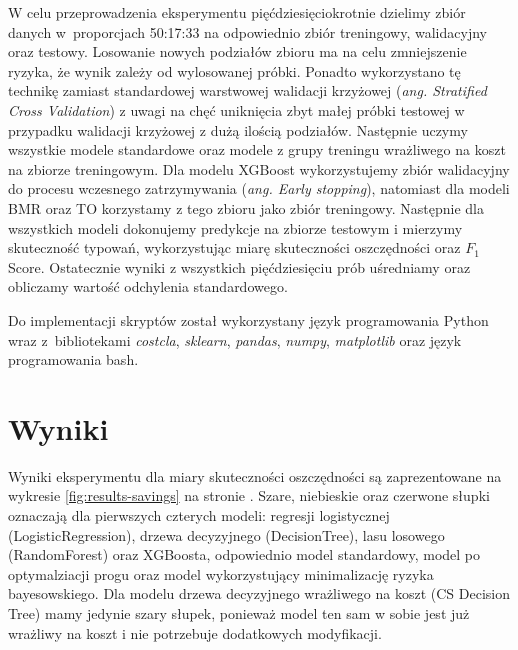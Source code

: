 \documentclass[inzynierska]{pwr_wmat_praca_dyplomowa}
\theoremstyle{plain}
\numberwithin{theorem}{chapter}
\theoremstyle{definition}
\numberwithin{theorem}{chapter}
\begin{document}
W celu przeprowadzenia eksperymentu pięćdziesięciokrotnie dzielimy zbiór danych w~proporcjach 50:17:33 na odpowiednio zbiór treningowy, walidacyjny oraz testowy. Losowanie nowych podziałów zbioru ma na celu zmniejszenie ryzyka, że wynik zależy od wylosowanej próbki. Ponadto wykorzystano tę technikę zamiast standardowej warstwowej walidacji krzyżowej (\textit{ang. Stratified Cross Validation}) z uwagi na chęć uniknięcia zbyt małej próbki testowej w przypadku walidacji krzyżowej z dużą ilością podziałów. Następnie uczymy wszystkie modele standardowe oraz modele z grupy treningu wrażliwego na koszt na zbiorze treningowym. Dla modelu XGBoost wykorzystujemy zbiór walidacyjny do procesu wczesnego zatrzymywania (\textit{ang. Early stopping}), natomiast dla modeli BMR oraz TO korzystamy z tego zbioru jako zbiór treningowy. Następnie dla wszystkich modeli dokonujemy predykcje na zbiorze testowym i mierzymy skuteczność typowań, wykorzystując miarę skuteczności oszczędności oraz $F_1$ Score. 
Ostatecznie wyniki z wszystkich pięćdziesięciu prób uśredniamy oraz obliczamy wartość odchylenia standardowego.

Do implementacji skryptów został wykorzystany język programowania Python wraz z~bibliotekami \textit{costcla}, \textit{sklearn}, \textit{pandas}, \textit{numpy}, \textit{matplotlib} oraz język programowania bash.

\section{Wyniki}

Wyniki eksperymentu dla miary skuteczności oszczędności są zaprezentowane na wykresie \ref{fig:results-savings} na stronie \pageref{fig:results-savings}. Szare, niebieskie oraz czerwone słupki oznaczają dla pierwszych czterych modeli: regresji logistycznej (LogisticRegression), drzewa decyzyjnego (DecisionTree), lasu losowego (RandomForest) oraz XGBoosta, odpowiednio model standardowy, model po optymalziacji progu oraz model wykorzystujący minimalizację ryzyka bayesowskiego. Dla modelu drzewa decyzyjnego wrażliwego na koszt (CS Decision Tree) mamy jedynie szary słupek, ponieważ model ten sam w sobie jest już wrażliwy na koszt i nie potrzebuje dodatkowych modyfikacji. 
\end{document}
